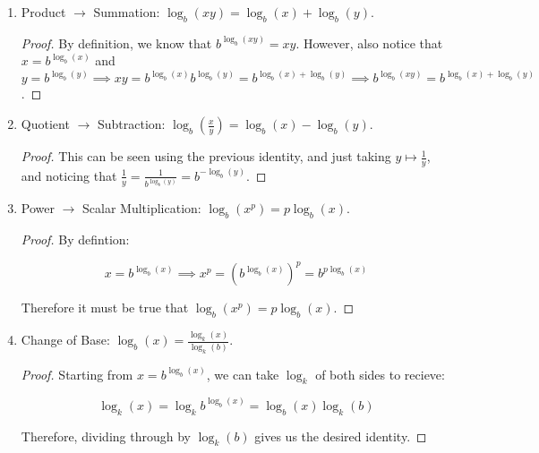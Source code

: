 \begin{enumerate}[(1)]

\item Product $\to$ Summation: $\log_b(xy) = \log_b(x) + \log_b(y)$.

\begin{proof}

By definition, we know that $b^{\log_b(xy)} = xy$. However, also notice that $x
= b^{\log_b(x)}$ and $y = b^{\log_b(y)} \implies xy = b^{\log_b(x)}b^{\log_b(y)}
= b^{\log_b(x) + \log_b(y)} \implies b^{\log_b(xy)} = b^{\log_b(x) + \log_b(y)}$.

\end{proof}

\item Quotient $\to$ Subtraction: $\log_b \left( \frac{x}{y} \right) = \log_b(x)
- \log_b(y)$. 

\begin{proof}
This can be seen using the previous identity, and just taking $y \mapsto
\frac{1}{y}$, and noticing that $\frac{1}{y} = \frac{1}{b^{\log_b(y)}} =
b^{-\log_b(y)}$.
\end{proof}

\item Power $\to$ Scalar Multiplication: $\log_b(x^p) = p\log_b(x)$.

\begin{proof}

By defintion:

$$
x = b^{\log_b(x)} \implies x^p = \left(b^{\log_b(x)}\right)^p = b^{p\log_b(x)} 
$$

Therefore it must be true that $\log_b(x^p) = p\log_b(x)$.

\end{proof}

\item Change of Base: $\log_b(x) = \frac{\log_k(x)}{\log_k(b)}$.

\begin{proof}

Starting from $x = b^{\log_b(x)}$, we can take $\log_k$ of both sides to
recieve:

$$
\log_k(x) = \log_k b^{\log_b(x)} = \log_b(x) \log_k(b)
$$

Therefore, dividing through by $\log_k(b)$ gives us the desired identity.

\end{proof}

\end{enumerate}

